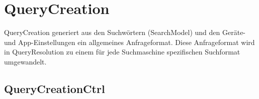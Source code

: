 
\section{QueryCreation}

QueryCreation generiert aus den Suchwörtern (SearchModel) und den Geräte- und App-Einstellungen ein allgemeines Anfrageformat. Diese Anfrageformat wird in QueryResolution zu einem für jede Suchmaschine spezifischen Suchformat umgewandelt.

\subsection{QueryCreationCtrl}

